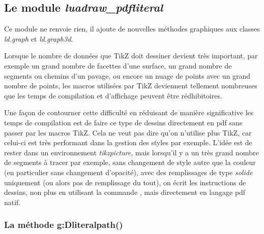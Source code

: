 \subsection{Le module \emph{luadraw\_pdfliteral}}

Ce module ne renvoie rien, il ajoute de nouvelles méthodes graphiques aux classes \emph{ld.graph} et \emph{ld.graph3d}.

Lorsque le nombre de données que TikZ doit dessiner devient très important, par exemple un grand nombre de facettes d'une surface, un grand nombre de segments ou chemins d'un pavage, ou encore un nuage de points avec un grand nombre de points, les macros utilisées par TikZ deviennent tellement nombreuses que les temps de compilation et d'affichage peuvent être rédhibitoires.

Une façon de contourner cette difficulté en réduisant de manière significative les temps de compilation est de faire ce type de dessins directement en pdf sans passer par les macros TikZ. Cela ne veut pas dire qu'on n'utilise plus TikZ, car celui-ci est très performant dans la gestion des styles par exemple. L'idée est de rester dans un environnement \emph{tikzpicture}, mais lorsqu'il y a un très grand nombre de segments à tracer par exemple, sans changement de style autre que la couleur (en particulier sans changement d'opacité), avec des remplissages de type \emph{solide} uniquement (ou alors pas de remplissage du tout), on écrit les instructions de dessins, non plus en utilisant la commande \drawcmd, mais directement en langage pdf natif.

\subsubsection{La méthode g:Dliteralpath()}

